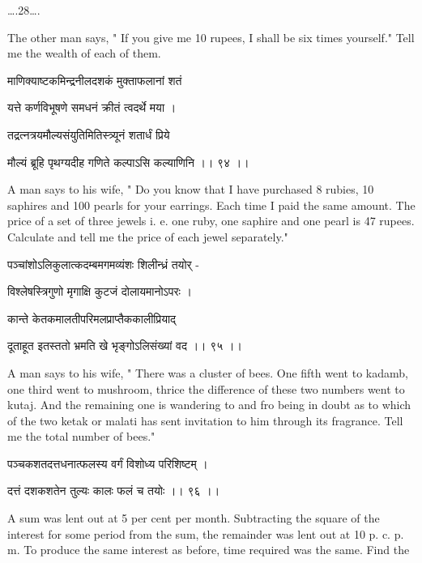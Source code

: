 \documentclass[]{article}
\date{}
\begin{document}
{\ldots{}.28\ldots{}.}

{The other man says, " If you give me 10 rupees, I shall be six times
yourself." Tell me the wealth of each of them.}

{माणिक्याष्टकमिन्द्रनीलदशकं मुक्ताफलानां शतं }

{यत्ते कर्णविभूषणे समधनं क्रीतं त्वदर्थे मया । }

{तद्रत्नत्रयमौल्यसंयुतिमितिस्त्र्यूनं शतार्धं प्रिये }

{मौल्यं ब्रूहि पृथग्यदीह गणिते कल्पाऽसि कल्याणिनि ।। ९४ ।। }

{A man says to his wife, " Do you know that I have purchased 8 rubies,
10 saphires and 100 pearls for your earrings. Each time I paid the same
amount. The price of a set of three jewels i. e. one ruby, one saphire
and one pearl is 47 rupees. Calculate and tell me the price of each
jewel separately."}

{पञ्चांशोऽलिकुलात्कदम्बमगमव्यंशः शिलीन्ध्रं तयोर् - }

{विश्लेषस्त्रिगुणो मृगाक्षि कुटजं दोलायमानोऽपरः । }

{कान्ते केतकमालतीपरिमलप्राप्तैककालीप्रियाद् }

{दूताहूत इतस्ततो भ्रमति खे भृङ्गोऽलिसंख्यां वद ।। ९५ ।। }

{A man says to his wife, " There was a cluster of bees. One fifth went
to kadamb, one third went to mushroom, thrice the difference of these
two numbers went to kutaj. And the remaining one is wandering to and fro
being in doubt as to which of the two ketak or malati has sent
invitation to him through its fragrance. Tell me the total number of
bees."}

{पञ्चकशतदत्तधनात्फलस्य वर्गं विशोध्य परिशिष्टम् । }

{दत्तं दशकशतेन तुल्यः कालः फलं च तयोः ।। ९६ ।। }

{A sum was lent out at 5 per cent per month. Subtracting the square of
the interest for some period from the sum, the remainder was lent out at
10 p. c. p. m. To produce the same interest as before, time required was
the same. Find the\\
}
\end{document}
